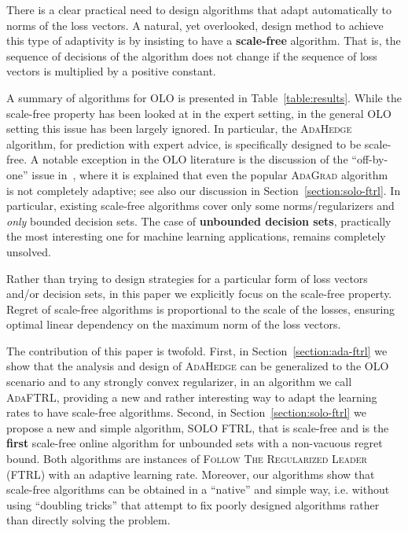 
There is a clear practical need to design algorithms that adapt automatically
to norms of the loss vectors.  A natural, yet overlooked, design method to
achieve this type of adaptivity is by insisting to have a \textbf{scale-free}
algorithm.  That is, the sequence of decisions of the algorithm does not change
if the sequence of loss vectors is multiplied by a positive constant.

A summary of algorithms for OLO is presented in Table~\ref{table:results}.
While the scale-free property has been looked at in the expert setting, in the
general OLO setting this issue has been largely ignored.  In particular, the
\textsc{AdaHedge}~\cite{de-Rooij-van-Erven-Grunwald-Koolen-2014} algorithm, for
prediction with expert advice, is specifically designed to be scale-free.  A
notable exception in the OLO literature is the discussion of the ``off-by-one''
issue in~\cite{McMahan-2014}, where it is explained that even the popular \textsc{AdaGrad}
algorithm~\cite{Duchi-Hazan-Singer-2011} is not completely adaptive; see also
our discussion in Section~\ref{section:solo-ftrl}. In particular, existing
scale-free algorithms cover only some norms/regularizers and \emph{only}
bounded decision sets. The case of \textbf{unbounded decision sets},
practically the most interesting one for machine learning applications, remains
completely unsolved.

Rather than trying to design strategies for a particular form of loss
vectors and/or decision sets, in this paper we explicitly focus on the
scale-free property. Regret of scale-free algorithms is proportional to the
scale of the losses, ensuring optimal linear dependency on the maximum norm of
the loss vectors.

The contribution of this paper is twofold. First, in
Section~\ref{section:ada-ftrl} we show that the analysis and design of
\textsc{AdaHedge} can be generalized to the OLO scenario and to any strongly convex
regularizer, in an algorithm we call \textsc{AdaFTRL}, providing a new and
rather interesting way to adapt the learning rates to have scale-free
algorithms.  Second, in Section~\ref{section:solo-ftrl} we propose a new and
simple algorithm, \textsc{SOLO FTRL}, that is scale-free and is the
\textbf{first} scale-free online algorithm for unbounded sets with a
non-vacuous regret bound.  Both algorithms are instances of \textsc{Follow The
Regularized Leader} (\textsc{FTRL}) with an adaptive learning rate.  Moreover, our
algorithms show that scale-free algorithms can be obtained in a ``native'' and
simple way, i.e.  without using ``doubling tricks'' that attempt to fix poorly
designed algorithms rather than directly solving the problem.

